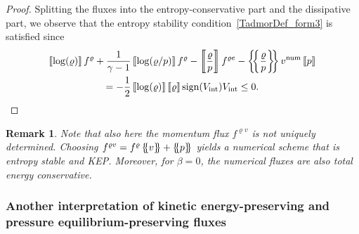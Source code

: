 \documentclass[]{scrartcl}
\newcommand*{\ldblbrace}{\{\mskip-5mu \left \{}
\newcommand*{\rdblbrace}{ \}\mskip-5mu \right \}}
\newcommand{\mean}[1]{\left\ldblbrace #1 \right\rdblbrace}
\newcommand{\jump}[1]{\left\llbracket #1  \right\rrbracket}
\newtheorem{remark}[theorem]{Remark}
\theoremstyle{definition}
\begin{document}
\begin{proof}
Splitting the fluxes into the entropy-conservative part and the dissipative part, we observe that the entropy stability condition~\eqref{TadmorDef_form3} is satisfied since
\begin{multline}
    \jump{\log ( \varrho)} f^{\varrho}
    + \frac{1}{\gamma - 1} \jump{\log(\varrho/p)} f^{\varrho}
    - \jump{\frac{\varrho}{p}} f^{\varrho e}
    - \mean{\frac{\varrho}{p}} v^{\mathrm{num}} \jump{p}
    \\
    =
    - \frac{1}{2} \jump{\log ( \varrho)} \jump{\varrho} \operatorname{sign}(V_{\mathrm{int}}) V_{\mathrm{int}}
    \le 0.
    \qedhere
\end{multline}
\end{proof}


\begin{remark}
    Note that also here the momentum flux $f^{\varrho v}$ is not uniquely determined. Choosing $f^{\varrho v} = f^{\varrho} \mean{v} + \mean{p}$ yields a numerical scheme that is entropy stable and KEP. Moreover, for $\beta = 0$, the numerical fluxes are also total energy conservative.
\end{remark}

\subsubsection{Another interpretation of kinetic energy-preserving and pressure equilibrium-preserving fluxes}
\end{document}
